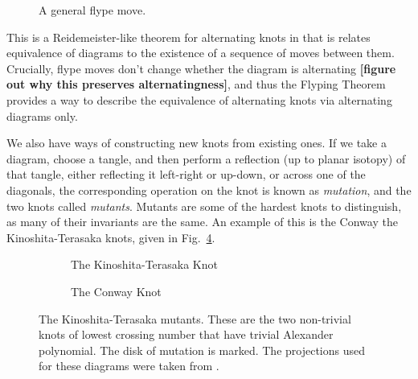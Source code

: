\documentclass[12pt]{report}
\newcommand{\noteblue}[1]{{\color{Blue} \textbf{#1}}}
\begin{document}
\begin{figure}[hbt]
	\centering
	\def\svgscale{0.5}
	
	\caption{A general flype move.}
	\label{fig:flype}
\end{figure}

This is a Reidemeister-like theorem for alternating knots in that is relates equivalence of diagrams to the existence of a sequence of moves between them. Crucially, flype moves don't change whether the diagram is alternating \noteblue{[figure out why this preserves alternatingness]}, and thus the Flyping Theorem provides a way to describe the equivalence of alternating knots via alternating diagrams only.

We also have ways of constructing new knots from existing ones. If we take a diagram, choose a tangle, and then perform a reflection (up to planar isotopy) of that tangle, either reflecting it left-right or up-down, or across one of the diagonals, the corresponding operation on the knot is known as \textit{mutation}, and the two knots called \textit{mutants}. Mutants are some of the hardest knots to distinguish, as many of their invariants are the same. An example of this is the Conway the Kinoshita-Terasaka knots, given in Fig.~\ref{fig:kinoshita-terasaka-mutants}.

\begin{figure}[hbt!]
	\centering
	\hspace*{\fill}
	\begin{subfigure}[b]{0.4 \textwidth}
		\centering
		\def\svgscale{0.25}
		
		\caption{The Kinoshita-Terasaka Knot}
		\label{fig:kinoshita-terasaka-knot}
	\end{subfigure}
	\hspace*{\fill} \hspace*{\fill}	\hspace*{\fill}
	\begin{subfigure}[b]{0.4 \textwidth}
		\centering
		\def\svgscale{0.25}
		
		\caption{The Conway Knot}
		\label{fig:conway-knot}
	\end{subfigure}
	\hspace*{\fill} 
	\caption{The Kinoshita-Terasaka mutants. These are the two non-trivial knots of lowest crossing number that have trivial Alexander polynomial. The disk of mutation is marked. The projections used for these diagrams were taken from \cite[Fig.~2.32]{the-knot-book}.}
	\label{fig:kinoshita-terasaka-mutants}
\end{figure}
\end{document}
